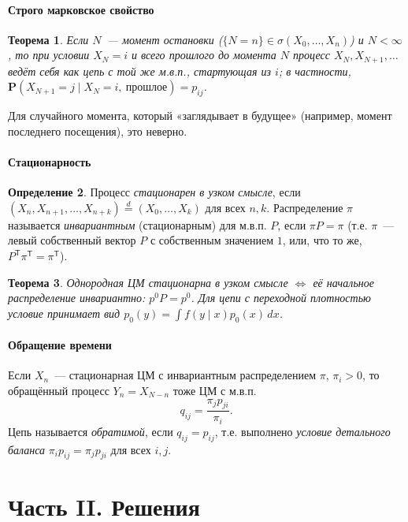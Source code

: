 \documentclass[11pt,a4paper]{article}
\newtheorem{thm}{Теорема}[section]
\theoremstyle{definition}
\newtheorem{defn}[thm]{Определение}
\newcommand{\PP}{\mathbf P}
\newcommand{\1}{\mathbf 1}
\newcommand{\eqd}{\overset{d}{=}}
\begin{document}
\subsection{Строго марковское свойство}

\begin{thm}
Если $N$~--- момент остановки ($\{N=n\}\in\sigma(X_0,\dots,X_n)$) и $N<\infty$,
то при условии $X_N=i$ и всего прошлого до момента $N$ процесс
$X_{N},X_{N+1},\dots$ ведёт себя как цепь с той же м.в.п., стартующая из $i$;
в частности, $\PP(X_{N+1}=j\mid X_N=i,\ \text{прошлое})=p_{ij}$.
\end{thm}
Для случайного момента, который «заглядывает в будущее» (например, момент
последнего посещения), это неверно.

\subsection{Стационарность}

\begin{defn}
Процесс \emph{стационарен в узком смысле}, если
$(X_{n},X_{n+1},\dots,X_{n+k})\eqd(X_0,\dots,X_k)$ для всех $n,k$.
Распределение $\pi$ называется \emph{инвариантным} (стационарным) для
м.в.п. $P$, если $\pi P=\pi$ (т.е. $\pi$~--- левый собственный вектор $P$ с
собственным значением $1$, или, что то же, $P^{\mathsf T}\pi^{\mathsf T}=\pi^{\mathsf T}$).
\end{defn}

\begin{thm}
Однородная ЦМ стационарна в узком смысле $\iff$ её начальное распределение
инвариантно: $p^0P=p^0$. Для цепи с переходной плотностью условие
принимает вид $p_0(y)=\int f(y\mid x)p_0(x)\,dx$.
\end{thm}

\subsection{Обращение времени}

Если $X_n$~--- стационарная ЦМ с инвариантным распределением $\pi$, $\pi_i>0$,
то обращённый процесс $Y_n=X_{N-n}$ тоже ЦМ с м.в.п.
\[
q_{ij}=\frac{\pi_jp_{ji}}{\pi_i}.
\]
Цепь называется \emph{обратимой}, если $q_{ij}=p_{ij}$, т.е. выполнено
\emph{условие детального баланса} $\pi_ip_{ij}=\pi_jp_{ji}$ для всех $i,j$.

\newpage
\part*{Часть II. Решения}
\end{document}
